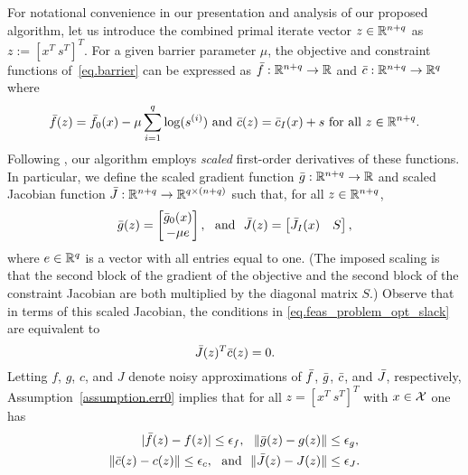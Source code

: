 For notational convenience in our presentation and analysis of our proposed algorithm, let us introduce the combined primal iterate vector $z \in \mathbb{R}^{n + q}$ as $z := [x^T\ s^T]^T$.  For a given barrier parameter $\mu$, the objective and constraint functions of~\eqref{eq.barrier} can be expressed as ${\bar f} : \mathbb{R}^{n+q} \to \mathbb{R}$ and ${\bar c} : \mathbb{R}^{n+q} \to \mathbb{R}^q$ where
\begin{equation*}
  {\bar f}(z) = {\bar f}_0(x) - \mu \sum_{i=1}^q \log(s^{(i)})\ \text{and}\ {\bar c}(z) = {\bar c}_I(x) + s\ \text{for all}\ z \in \mathbb{R}^{n+q}.
\end{equation*}
Following \cite{CurtScheWaec10}, our algorithm employs \textit{scaled} first-order derivatives of these functions.  In particular, we define the scaled gradient function ${\bar g} : \mathbb{R}^{n+q} \to \mathbb{R}$ and scaled Jacobian function ${\bar J} : \mathbb{R}^{n+q} \to \mathbb{R}^{q \times (n+q)}$ such that, for all $z \in \mathbb{R}^{n+q}$,
\begin{equation*}
  {\bar g}(z) = \begin{bmatrix} {\bar g}_0(x) \\ -\mu e \end{bmatrix},\ \ \text{and}\ \ {\bar J}(z) = \begin{bmatrix} {\bar J}_I(x) & S \end{bmatrix},
\end{equation*}
where $e \in \mathbb{R}^q$ is a vector with all entries equal to one.  (The imposed scaling is that the second block of the gradient of the objective and the second block of the constraint Jacobian are both multiplied by the diagonal matrix $S$.)  Observe that in terms of this scaled Jacobian, the conditions in \eqref{eq.feas_problem_opt_slack} are equivalent to
\begin{equation}\label{eq.feas_problem_opt_z}
  {\bar J}(z)^T{\bar c}(z) = 0.
\end{equation}
Letting $f$, $g$, $c$, and $J$ denote noisy approximations of ${\bar f}$, ${\bar g}$, ${\bar c}$, and ${\bar J}$, respectively, Assumption~\ref{assumption.err0} implies that for all $z = [x^T\ s^T]^T$ with $x \in \mathcal{X}$ one has
\begin{equation}\label{eq.errors2}
  \begin{aligned}
    |\ftrue(z) - f(z)| \leq \eps_f,\ \ \|\gtrue(z) - g(z) \| &\leq \eps_g, \\ \|\ctrue(z) - c(z)\| \leq \epsilon_c,\ \ \text{and}\ \ \|\Jtrue(z) - J(z)\| &\leq \epsilon_J.
  \end{aligned}
\end{equation}

